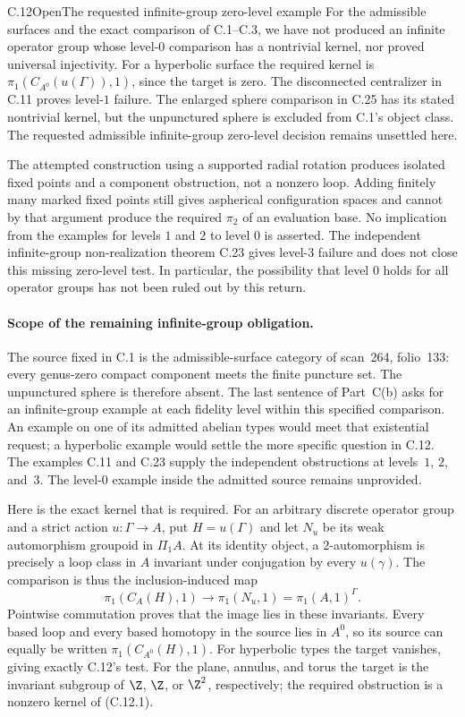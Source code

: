 \begin{claim}{C.12}{Open}{The requested infinite-group zero-level example}
For the admissible surfaces and the exact comparison of C.1--C.3,
we have not produced an infinite operator group whose level-$0$
comparison has a nontrivial kernel, nor proved universal injectivity.
For a hyperbolic surface the required kernel is
$\pi_1(C_{A^0}(u(\Gamma)),1)$, since the target is zero.
The disconnected centralizer in C.11 proves level-$1$ failure.
The enlarged sphere comparison in C.25 has its stated nontrivial
kernel, but the unpunctured sphere is excluded from C.1's object class.
The requested admissible infinite-group zero-level decision remains
unsettled here.
\end{claim}
The attempted construction using a supported radial rotation produces
isolated fixed points and a component obstruction, not a nonzero loop.
Adding finitely many marked fixed points still gives aspherical
configuration spaces and cannot by that argument produce the required
$\pi_2$ of an evaluation base. No implication from the examples for
levels $1$ and $2$ to level $0$ is asserted. The independent infinite-group
non-realization theorem C.23 gives level-$3$ failure and does not close
this missing zero-level test. In particular, the possibility that level
$0$ holds for all operator groups has not been ruled out by this return.

\paragraph{Scope of the remaining infinite-group obligation.}
The source fixed in C.1 is the admissible-surface category of scan~264,
folio~133: every genus-zero compact component meets the finite puncture
set. The unpunctured sphere is therefore absent. The last sentence of
Part~C(b) asks for an infinite-group example at each fidelity level
within this specified comparison. An example on one of its admitted
abelian types would meet that existential request; a hyperbolic example
would settle the more specific question in C.12. The examples C.11 and
C.23 supply the independent obstructions at levels~$1$, $2$, and~$3$.
The level-$0$ example inside the admitted source remains unprovided.

Here is the exact kernel that is required. For an arbitrary discrete
operator group and a strict action $u:\Gamma\to A$, put
$H=u(\Gamma)$ and let $N_u$ be its weak automorphism groupoid in
$\Pi_1A$. At its identity object, a $2$-automorphism is precisely a
loop class in $A$ invariant under conjugation by every $u(\gamma)$.
The comparison is thus the inclusion-induced map
\[
 \pi_1(C_A(H),1)\longrightarrow
 \pi_1(N_u,1)=\pi_1(A,1)^\Gamma.                 \tag{C.12.1}
\]
Pointwise commutation proves that the image lies in these invariants.
Every based loop and every based homotopy in the source lies in $A^0$,
so its source can equally be written $\pi_1(C_{A^0}(H),1)$.
For hyperbolic types the target vanishes, giving exactly C.12's test.
For the plane, annulus, and torus the target is the invariant subgroup
of $\Z$, $\Z$, or $\Z^2$, respectively; the required obstruction is a
nonzero kernel of (C.12.1).

